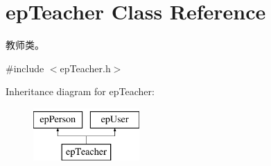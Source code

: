 \hypertarget{classepTeacher}{\section{ep\-Teacher \-Class \-Reference}
\label{classepTeacher}
}


教师类。  




{\ttfamily \#include $<$ep\-Teacher.\-h$>$}

\-Inheritance diagram for ep\-Teacher\-:\begin{figure}[H]
\begin{center}
\leavevmode
\includegraphics[height=2.000000cm]{classepTeacher}
\end{center}
\end{figure}
